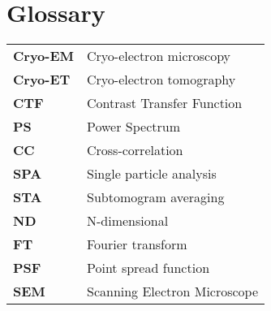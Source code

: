 \chapter{Glossary}

\renewcommand{\arraystretch}{1.5}

\begin{tabularx}{\linewidth}{>{\bfseries}l X}
Cryo-EM & Cryo-electron microscopy \\
Cryo-ET & Cryo-electron tomography \\
CTF & Contrast Transfer Function \\
PS & Power Spectrum \\
CC & Cross-correlation \\
SPA & Single particle analysis \\
STA & Subtomogram averaging \\
ND & N-dimensional \\
FT & Fourier transform \\
PSF & Point spread function \\
SEM & Scanning Electron Microscope \\
\end{tabularx}

